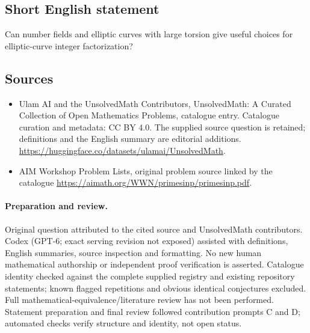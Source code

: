 \documentclass[11pt]{article}
\begin{document}
\subsection{Short English statement}
Can number fields and elliptic curves with large torsion give useful choices for elliptic-curve integer factorization?
\subsection{Sources}
\begin{itemize}
\item[\hypertarget{source:statement:1}{S1}] Ulam AI and the UnsolvedMath Contributors, UnsolvedMath: A Curated Collection of Open Mathematics Problems, catalogue entry. Catalogue curation and metadata: CC BY 4.0. The supplied source question is retained; definitions and the English summary are editorial additions.
\url{https://huggingface.co/datasets/ulamai/UnsolvedMath}.
\item[\hypertarget{source:statement:2}{S2}] AIM Workshop Problem Lists, original problem source linked by the catalogue
\url{https://aimath.org/WWN/primesinp/primesinp.pdf}.
\end{itemize}
\paragraph{Preparation and review.}
Original question attributed to the cited source and UnsolvedMath contributors. Codex (GPT-6; exact serving revision not exposed) assisted with definitions, English summaries, source inspection and formatting. No new human mathematical authorship or independent proof verification is asserted. Catalogue identity checked against the complete supplied registry and existing repository statements; known flagged repetitions and obvious identical conjectures excluded. Full mathematical-equivalence/literature review has not been performed. Statement preparation and final review followed contribution prompts C and D; automated checks verify structure and identity, not open status.
\label{end:statement}
\end{document}
